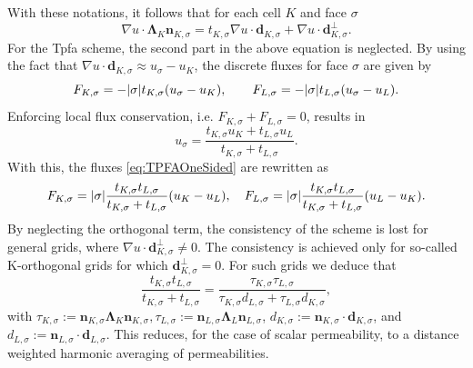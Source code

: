 With these notations, it follows that for each cell $K$ and face $\sigma$ 
\begin{equation}
\nabla u \cdot \mathbf{\Lambda}_K \mathbf{n}_{K, \sigma} =  t_{K,\sigma} \nabla u \cdot \mathbf{d}_{K,\sigma} + \nabla u \cdot \mathbf{d}^{\bot}_{K,\sigma}.
\end{equation}
For the Tpfa scheme, the second part in the above equation is neglected. By using the fact that $\nabla u \cdot \mathbf{d}_{K,\sigma} \approx u_\sigma - u_K$, the discrete fluxes for face $\sigma$ are given by
\begin{equation}
F_{K,\sigma} = -\lvert{\sigma}\rvert  t_{K,\sigma} (u_\sigma - u_K), \qquad F_{L,\sigma} = -\lvert{\sigma}\rvert  t_{L,\sigma} (u_\sigma - u_L).
\label{eq:TPFAOneSided}
\end{equation}
Enforcing local flux conservation, i.e. $F_{K,\sigma}+F_{L,\sigma}=0$, results in 
\begin{equation}
u_\sigma = \frac{t_{K,\sigma} u_K + t_{L,\sigma} u_L}{t_{K,\sigma}  + t_{L,\sigma}}.
\end{equation}
With this, the fluxes \eqref{eq:TPFAOneSided} are rewritten as
\begin{equation}
F_{K,\sigma} = \lvert{\sigma}\rvert  \frac{t_{K,\sigma} t_{L,\sigma}}{t_{K,\sigma} + t_{L,\sigma}} (u_K - u_L), \quad F_{L,\sigma} = \lvert{\sigma}\rvert  \frac{t_{K,\sigma} t_{L,\sigma}}{t_{K,\sigma} + t_{L,\sigma}} (u_L - u_K).
\label{eq:TPFAFlux}
\end{equation}
By neglecting the orthogonal term, the consistency of the scheme is lost for general grids, where $\nabla u \cdot \mathbf{d}^{\bot}_{K,\sigma} \not = 0$. The consistency is achieved only for so-called K-orthogonal grids for which $\mathbf{d}^{\bot}_{K,\sigma} = 0$. For such grids we deduce that 
\begin{equation}
\frac{t_{K,\sigma} t_{L,\sigma}}{t_{K,\sigma} + t_{L,\sigma}} = \frac{\tau_{K,\sigma} \tau_{L,\sigma}}{\tau_{K,\sigma} d_{L,\sigma} + \tau_{L,\sigma} d_{K,\sigma}},
\label{eq:TPFAcoeffNew}
\end{equation}
with $\tau_{K,\sigma} := \mathbf{n}_{K, \sigma} \mathbf{\Lambda}_K\mathbf{n}_{K, \sigma}, \tau_{L,\sigma} := \mathbf{n}_{L, \sigma} \mathbf{\Lambda}_L\mathbf{n}_{L, \sigma}$, $d_{K,\sigma}:= \mathbf{n}_{K, \sigma} \cdot \mathbf{d}_{K, \sigma}$, and $d_{L,\sigma}:= \mathbf{n}_{L, \sigma} \cdot \mathbf{d}_{L, \sigma}$. This reduces, for the case of scalar permeability, to a distance weighted harmonic averaging of permeabilities.

 

